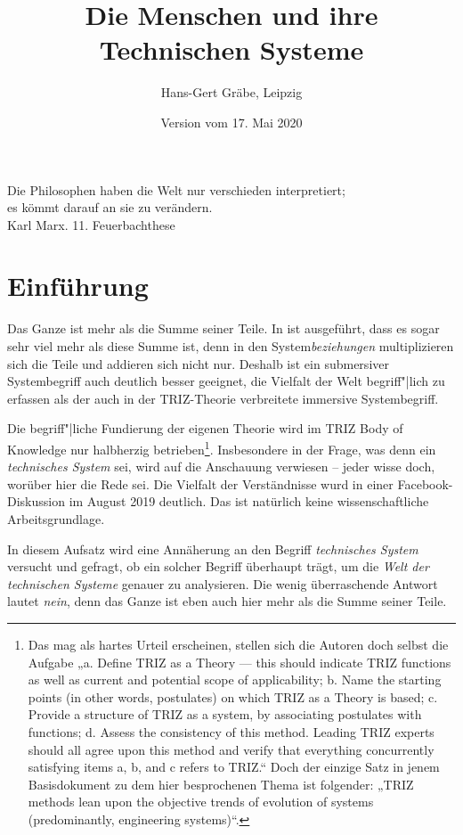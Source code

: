 \documentclass[11pt,a4paper]{article}
\title{Die Menschen und ihre Technischen Systeme}
\author{Hans-Gert Gräbe, Leipzig}
\date{Version vom 17. Mai 2020}
\begin{document}
\maketitle\vfill
\tableofcontents
\pagebreak
\begin{flushright}
  Die Philosophen haben die Welt nur verschieden interpretiert;\\ es kömmt
  darauf an sie zu verändern.\\ Karl Marx. 11. Feuerbachthese
\end{flushright}

\section{Einführung}

Das Ganze ist mehr als die Summe seiner Teile. In \cite{Graebe2020} ist
ausgeführt, dass es sogar sehr viel mehr als diese Summe ist, denn in den
System\emph{beziehungen} multiplizieren sich die Teile und addieren sich nicht
nur.  Deshalb ist ein submersiver Systembegriff auch deutlich besser geeignet,
die Vielfalt der Welt begriff"|lich zu erfassen als der auch in der
TRIZ-Theorie verbreitete immersive Systembegriff.

Die begriff"|liche Fundierung der eigenen Theorie wird im TRIZ Body of
Knowledge \cite{TBK-2007} nur halbherzig betrieben\footnote{Das mag als hartes
  Urteil erscheinen, stellen sich die Autoren doch selbst die Aufgabe „a.
  Define TRIZ as a Theory — this should indicate TRIZ functions as well as
  current and potential scope of applicability; b.  Name the starting points
  (in other words, postulates) on which TRIZ as a Theory is based; c.  Provide
  a structure of TRIZ as a system, by associating postulates with functions;
  d.  Assess the consistency of this method. Leading TRIZ experts should all
  agree upon this method and verify that everything concurrently satisfying
  items a, b, and c refers to TRIZ.“ Doch der einzige Satz in jenem
  Basisdokument zu dem hier besprochenen Thema ist folgender: „TRIZ methods
  lean upon the objective trends of evolution of systems (predominantly,
  engineering systems)“.}. Insbesondere in der Frage, was denn ein
\emph{technisches System} sei, wird auf die Anschauung verwiesen -- jeder
wisse doch, worüber hier die Rede sei. Die Vielfalt der Verständnisse wurd in
einer Facebook-Diskussion \cite{Graebe2019b} im August 2019 deutlich.  Das ist
natürlich keine wissenschaftliche Arbeitsgrundlage.

In diesem Aufsatz wird eine Annäherung an den Begriff \emph{technisches
  System} versucht und gefragt, ob ein solcher Begriff überhaupt trägt, um die
\emph{Welt der technischen Systeme} genauer zu analysieren.  Die wenig
überraschende Antwort lautet \emph{nein}, denn das Ganze ist eben auch hier
mehr als die Summe seiner Teile.
\end{document}
